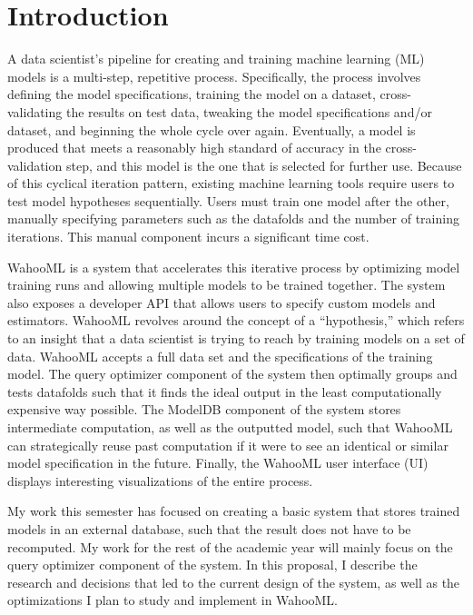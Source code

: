 \documentclass[../proposal.tex]{subfiles}
\begin{document}
\section{Introduction}

A data scientist's pipeline for creating and training machine learning (ML)
models is a multi-step, repetitive process. Specifically, the process involves 
defining the model specifications, training the model on a dataset, cross-
validating the results on test data, tweaking the model specifications and/or
dataset, and beginning the whole cycle over again. Eventually, a model is 
produced that meets a reasonably high standard of accuracy in the cross-
validation step, and this model is the one that is selected for further use.
Because of this cyclical iteration pattern, existing machine learning tools
require users to test model hypotheses sequentially. Users must train one model
after the other, manually specifying parameters such as the datafolds and the
number of training iterations. This manual component incurs a significant time
cost. 

WahooML is a system that accelerates this iterative process by optimizing model
training runs and allowing multiple models to be trained together. The
system also exposes a developer API that allows users to specify custom models
and estimators. WahooML revolves around the concept of a ``hypothesis,'' which
refers to an insight that a data scientist is trying to reach by training
models on a set of data. WahooML accepts a full data set and the specifications
of the training model. The query optimizer component of the system then
optimally groups and tests datafolds such that it finds the ideal output in the
least computationally expensive way possible. The ModelDB component of the
system stores intermediate computation, as well as the outputted model, such
that WahooML can strategically reuse past computation if it were to see an
identical or similar model specification in the future. Finally, the WahooML
user interface (UI) displays interesting visualizations of the entire process.

My work this semester has focused on creating a basic system that stores
trained models in an external database, such that the result does not have to
be recomputed. My work for the rest of the academic year will mainly focus on
the query optimizer component of the system. In this proposal, I describe the
research and decisions that led to the current design of the system, as well as
the optimizations I plan to study and implement in WahooML.
\end{document}
